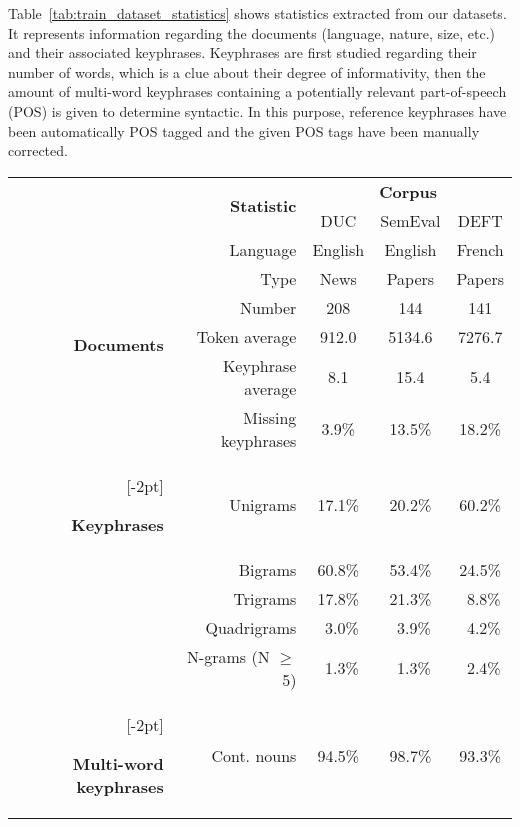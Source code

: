     Table~\ref{tab:train_dataset_statistics} shows statistics extracted from our
    datasets. It represents information regarding the documents (language,
    nature, size, etc.) and their associated keyphrases. Keyphrases are first
    studied regarding their number of words, which is a clue about their degree
    of informativity, then the amount of multi-word keyphrases containing a
    potentially relevant part-of-speech (POS) is given to determine syntactic.
    In this purpose, reference keyphrases have been automatically POS tagged and
    the given POS tags have been manually corrected.
    \begin{table}[h]
      \centering
      \begin{tabular}{@{~}r@{~}r@{~}c@{~}c@{~}c@{~}}
        \toprule
        & \multirow{2}{*}[-2pt]{\textbf{Statistic}} & \multicolumn{3}{c}{\textbf{Corpus}}\\
        \cmidrule{3-5}
        & & DUC & SemEval & DEFT\\
        \midrule
        \multirow{6}{*}[-2pt]{\begin{sideways}\textbf{Documents}\end{sideways}} & Language & English & English & French\\
        & Type & News & Papers & Papers\\
        & Number & 208 & 144 & 141\\
        & Token average & 912.0 & 5134.6 & 7276.7\\
        & Keyphrase average & 8.1 & 15.4 & 5.4\\
        & Missing keyphrases & 3.9\% & 13.5\% & 18.2\%\\
        \addlinespace[1.5\defaultaddspace]
        \multirow{5}{*}[-2pt]{\begin{sideways}\textbf{Keyphrases}\end{sideways}} & Unigrams & 17.1\% & 20.2\% & 60.2\%\\
        & Bigrams & 60.8\% & 53.4\% & 24.5\%\\
        & Trigrams & 17.8\% & 21.3\% & $~~$8.8\%\\
        & Quadrigrams & $~~$3.0\% & $~~$3.9\% & $~~$4.2\%\\
        & N-grams (N $\geq$ 5) & $~~$1.3\% & $~~$1.3\% & $~~$2.4\%\\
        \addlinespace[1.5\defaultaddspace]
        \multirow{5}{*}[-2pt]{\begin{sideways}\textbf{Multi-word keyphrases}\end{sideways}} & Cont. nouns & 94.5\% & 98.7\% & 93.3\%\\

\end{tabular}
\end{table}
